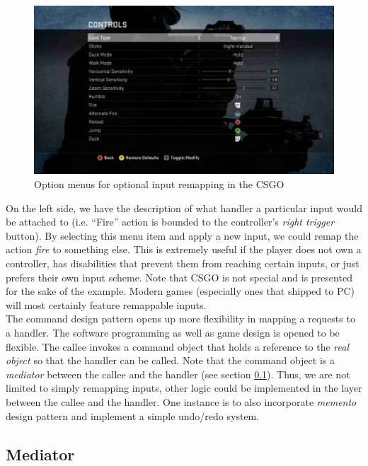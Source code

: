 \begin{multicols}{2}
\begin{figure}[H]
	\centering
	\includegraphics[width=\fullwidth]{assets/csgo-inputs}
	\caption{Option menus for optional input remapping in the CSGO}
	\label{fig:csgo-input}
\end{figure}

On the left side, we have the description of what handler a particular input would be attached to (i.e. ``Fire'' action is bounded to the controller's \textit{right trigger} button). By selecting this menu item and apply a new input, we could remap the action \textit{fire} to something else. This is extremely useful if the player does not own a controller, has disabilities that prevent them from reaching certain inputs, or just prefers their own input scheme. Note that CSGO is not special and is presented for the sake of the example. Modern games (especially ones that shipped to PC) will most certainly feature remappable inputs.\bs
\\
The command design pattern opens up more flexibility in mapping a requests to a handler. The software programming as well as game design is opened to be flexible. The callee invokes a command object that holds a reference to the \textit{real object} so that the handler can be called. Note that the command object is a \textit{mediator} between the callee and the handler (see section \ref{ssection:mediator}). Thus, we are not limited to simply remapping inputs, other logic could be implemented in the layer between the callee and the handler. One instance is to also incorporate \textit{memento} design pattern and implement a simple undo/redo system.\bs
\\

\subsection{Mediator}\label{ssection:mediator}


\end{multicols}

